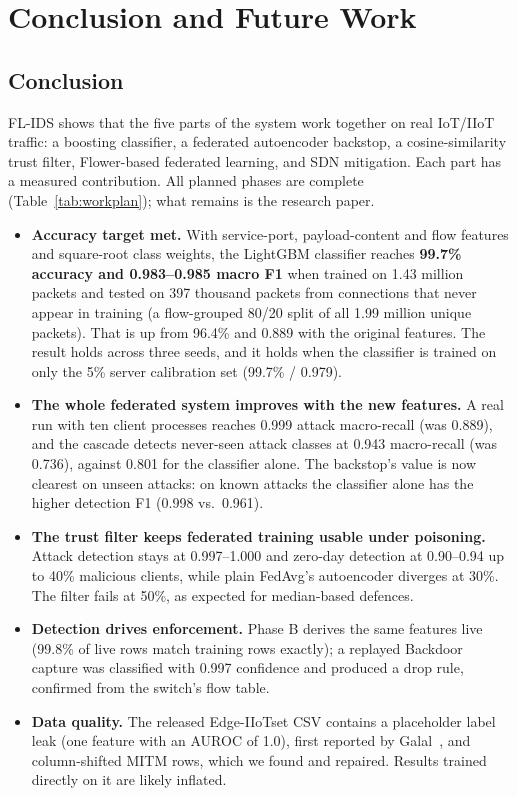 \chapter{Conclusion and Future Work}

\section*{Conclusion}
FL-IDS shows that the five parts of the system work together on real IoT/IIoT traffic: a boosting classifier, a federated autoencoder backstop, a cosine-similarity trust filter, Flower-based federated learning, and SDN mitigation. Each part has a measured contribution. All planned phases are complete (Table~\ref{tab:workplan}); what remains is the research paper.

\begin{itemize}
  \item \textbf{Accuracy target met.} With service-port, payload-content and flow features and square-root class weights, the LightGBM classifier reaches \textbf{99.7\% accuracy and 0.983--0.985 macro F1} when trained on 1.43 million packets and tested on 397 thousand packets from connections that never appear in training (a flow-grouped 80/20 split of all 1.99 million unique packets). That is up from 96.4\% and 0.889 with the original features. The result holds across three seeds, and it holds when the classifier is trained on only the 5\% server calibration set (99.7\% / 0.979).
  \item \textbf{The whole federated system improves with the new features.} A real run with ten client processes reaches 0.999 attack macro-recall (was 0.889), and the cascade detects never-seen attack classes at 0.943 macro-recall (was 0.736), against 0.801 for the classifier alone. The backstop's value is now clearest on unseen attacks: on known attacks the classifier alone has the higher detection F1 (0.998 vs.\ 0.961).
  \item \textbf{The trust filter keeps federated training usable under poisoning.} Attack detection stays at 0.997--1.000 and zero-day detection at 0.90--0.94 up to 40\% malicious clients, while plain FedAvg's autoencoder diverges at 30\%. The filter fails at 50\%, as expected for median-based defences.
  \item \textbf{Detection drives enforcement.} Phase B derives the same features live (99.8\% of live rows match training rows exactly); a replayed Backdoor capture was classified with 0.997 confidence and produced a drop rule, confirmed from the switch's flow table.
  \item \textbf{Data quality.} The released Edge-IIoTset CSV contains a placeholder label leak (one feature with an AUROC of 1.0), first reported by Galal~\cite{galal2026provenance}, and column-shifted MITM rows, which we found and repaired. Results trained directly on it are likely inflated.
\end{itemize}

